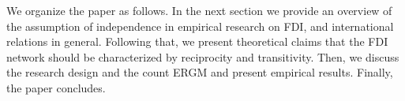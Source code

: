 \documentclass[reqno,onecolumn,letterpaper,12pt]{article}
\begin{document}




We organize the paper as follows. In the next section we provide an overview of the assumption of independence in empirical research on FDI, and international relations in general. Following that, we present theoretical claims that the FDI network should be characterized by reciprocity and transitivity. Then, we discuss the research design and the count ERGM and present empirical results. Finally, the paper concludes. 



\end{document}
